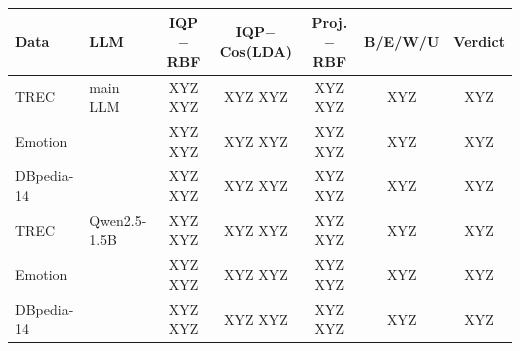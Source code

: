 \begin{tabular}{@{}ll ccc cc@{}}
\toprule
Data & LLM & IQP$-$RBF & IQP$-$Cos(LDA) & Proj.$-$RBF & B/E/W/U & Verdict \\
\midrule
TREC & main LLM & XYZ XYZ & XYZ XYZ & XYZ XYZ & XYZ & XYZ \\
Emotion &  & XYZ XYZ & XYZ XYZ & XYZ XYZ & XYZ & XYZ \\
DBpedia-14 &  & XYZ XYZ & XYZ XYZ & XYZ XYZ & XYZ & XYZ \\
\midrule
TREC & Qwen2.5-1.5B & XYZ XYZ & XYZ XYZ & XYZ XYZ & XYZ & XYZ \\
Emotion &  & XYZ XYZ & XYZ XYZ & XYZ XYZ & XYZ & XYZ \\
DBpedia-14 &  & XYZ XYZ & XYZ XYZ & XYZ XYZ & XYZ & XYZ \\
\bottomrule
\end{tabular}
